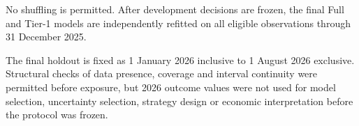 No shuffling is permitted. After development decisions are frozen, the final Full and Tier-1 models are independently refitted on all eligible observations through 31 December 2025.

The final holdout is fixed as 1 January 2026 inclusive to 1 August 2026 exclusive. Structural checks of data presence, coverage and interval continuity were permitted before exposure, but 2026 outcome values were not used for model selection, uncertainty selection, strategy design or economic interpretation before the protocol was frozen.
